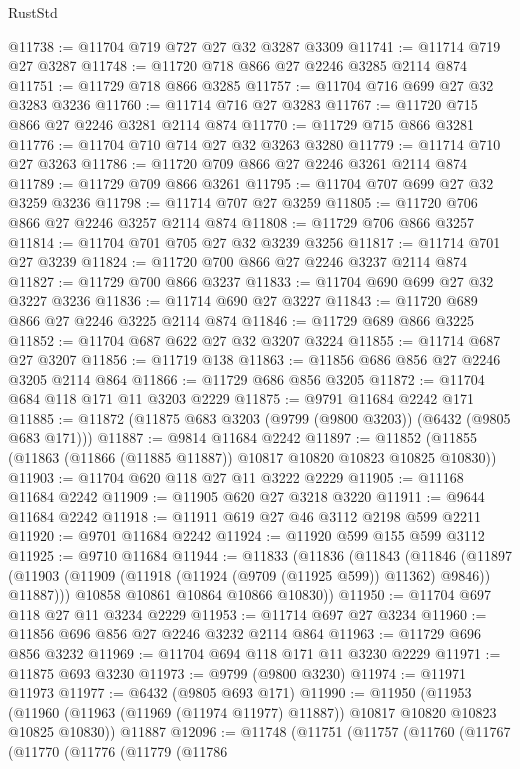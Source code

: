 \begin{lexlean}{RustStd}
\begin{coremodule}
@11738 := @11704 @719 @727 @27 @32 @3287 @3309
@11741 := @11714 @719 @27 @3287
@11748 := @11720 @718 @866 @27 @2246 @3285 @2114 @874
@11751 := @11729 @718 @866 @3285
@11757 := @11704 @716 @699 @27 @32 @3283 @3236
@11760 := @11714 @716 @27 @3283
@11767 := @11720 @715 @866 @27 @2246 @3281 @2114 @874
@11770 := @11729 @715 @866 @3281
@11776 := @11704 @710 @714 @27 @32 @3263 @3280
@11779 := @11714 @710 @27 @3263
@11786 := @11720 @709 @866 @27 @2246 @3261 @2114 @874
@11789 := @11729 @709 @866 @3261
@11795 := @11704 @707 @699 @27 @32 @3259 @3236
@11798 := @11714 @707 @27 @3259
@11805 := @11720 @706 @866 @27 @2246 @3257 @2114 @874
@11808 := @11729 @706 @866 @3257
@11814 := @11704 @701 @705 @27 @32 @3239 @3256
@11817 := @11714 @701 @27 @3239
@11824 := @11720 @700 @866 @27 @2246 @3237 @2114 @874
@11827 := @11729 @700 @866 @3237
@11833 := @11704 @690 @699 @27 @32 @3227 @3236
@11836 := @11714 @690 @27 @3227
@11843 := @11720 @689 @866 @27 @2246 @3225 @2114 @874
@11846 := @11729 @689 @866 @3225
@11852 := @11704 @687 @622 @27 @32 @3207 @3224
@11855 := @11714 @687 @27 @3207
@11856 := @11719 @138
@11863 := @11856 @686 @856 @27 @2246 @3205 @2114 @864
@11866 := @11729 @686 @856 @3205
@11872 := @11704 @684 @118 @171 @11 @3203 @2229
@11875 := @9791 @11684 @2242 @171
@11885 := @11872 (@11875 @683 @3203 (@9799 (@9800 @3203)) (@6432 (@9805 @683 @171)))
@11887 := @9814 @11684 @2242
@11897 := @11852 (@11855 (@11863 (@11866 (@11885 @11887)) @10817 @10820 @10823 @10825 @10830))
@11903 := @11704 @620 @118 @27 @11 @3222 @2229
@11905 := @11168 @11684 @2242
@11909 := @11905 @620 @27 @3218 @3220
@11911 := @9644 @11684 @2242
@11918 := @11911 @619 @27 @46 @3112 @2198 @599 @2211
@11920 := @9701 @11684 @2242
@11924 := @11920 @599 @155 @599 @3112
@11925 := @9710 @11684
@11944 := @11833
    (@11836
      (@11843
        (@11846
          (@11897 (@11903 (@11909 (@11918 (@11924 (@9709 (@11925 @599)) @11362) @9846)) @11887)))
        @10858
        @10861
        @10864
        @10866
        @10830))
@11950 := @11704 @697 @118 @27 @11 @3234 @2229
@11953 := @11714 @697 @27 @3234
@11960 := @11856 @696 @856 @27 @2246 @3232 @2114 @864
@11963 := @11729 @696 @856 @3232
@11969 := @11704 @694 @118 @171 @11 @3230 @2229
@11971 := @11875 @693 @3230
@11973 := @9799 (@9800 @3230)
@11974 := @11971 @11973
@11977 := @6432 (@9805 @693 @171)
@11990 := @11950
    (@11953 (@11960 (@11963 (@11969 (@11974 @11977) @11887)) @10817 @10820 @10823 @10825 @10830))
    @11887
@12096 := @11748
    (@11751
      (@11757
        (@11760
          (@11767
            (@11770
              (@11776
                (@11779
                  (@11786

\end{coremodule}
\end{lexlean}
